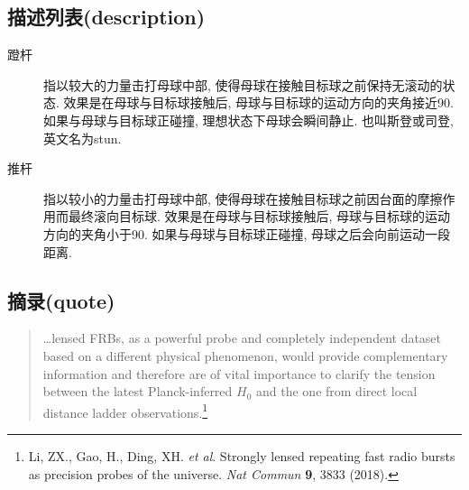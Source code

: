 \documentclass{ctexart}
\begin{document}
    \subsection{描述列表(description)}
    \begin{description}
        \item[蹬杆] 指以较大的力量击打母球中部, 使得母球在接触目标球之前保持无滚动的状态. 效果是在母球与目标球接触后, 母球与目标球的运动方向的夹角接近90\textdegree. 如果与母球与目标球正碰撞, 理想状态下母球会瞬间静止. 也叫斯登或司登, 英文名为stun. 
        \item[推杆] 指以较小的力量击打母球中部, 使得母球在接触目标球之前因台面的摩擦作用而最终滚向目标球. 效果是在母球与目标球接触后, 母球与目标球的运动方向的夹角小于90\textdegree. 如果与母球与目标球正碰撞, 母球之后会向前运动一段距离. 
    \end{description}
    \subsection{摘录(quote)}
    \begin{quote}
        \dots lensed FRBs, as a powerful probe and completely independent dataset based on a different physical phenomenon, would provide complementary information and therefore are of vital importance to clarify the tension between the latest Planck-inferred $H_0$ and the one from direct local distance ladder observations.\footnote{
            Li, ZX., Gao, H., Ding, XH. \textit{et al}. Strongly lensed
            repeating fast radio bursts as precision probes of the universe.
            \textit{Nat Commun} \textbf{9}, 3833 (2018).}
    \end{quote}
\end{document}
